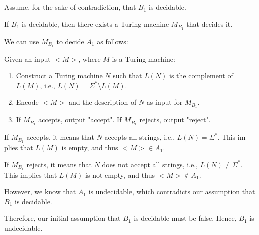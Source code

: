 \documentclass{article}
\begin{document}
\subsection{}
\begin{latin}
Assume, for the sake of contradiction, that $B_1$ is decidable. 

If $B_1$ is decidable, then there exists a Turing machine $M_{B_1}$ that decides it. 

We can use $M_{B_1}$ to decide $A_1$ as follows:

Given an input $< M >$, where $M$ is a Turing machine:
\begin{enumerate}
    \item Construct a Turing machine $N$ such that $L(N)$ is the complement of $L(M)$, i.e., $L(N) = \Sigma^* \setminus L(M)$.
    \item Encode $< M >$ and the description of $N$ as input for $M_{B_1}$.
    \item If $M_{B_1}$ accepts, output "accept". If $M_{B_1}$ rejects, output "reject".
\end{enumerate}

If $M_{B_1}$ accepts, it means that $N$ accepts all strings, i.e., $L(N) = \Sigma^*$. This implies that $L(M)$ is empty, and thus $< M > \in A_1$. 

If $M_{B_1}$ rejects, it means that $N$ does not accept all strings, i.e., $L(N) \neq \Sigma^*$. This implies that $L(M)$ is not empty, and thus $< M > \notin A_1$. 

However, we know that $A_1$ is undecidable, which contradicts our assumption that $B_1$ is decidable.

Therefore, our initial assumption that $B_1$ is decidable must be false. Hence, $B_1$ is undecidable.
\end{latin}


\subsection{}


\end{document}
